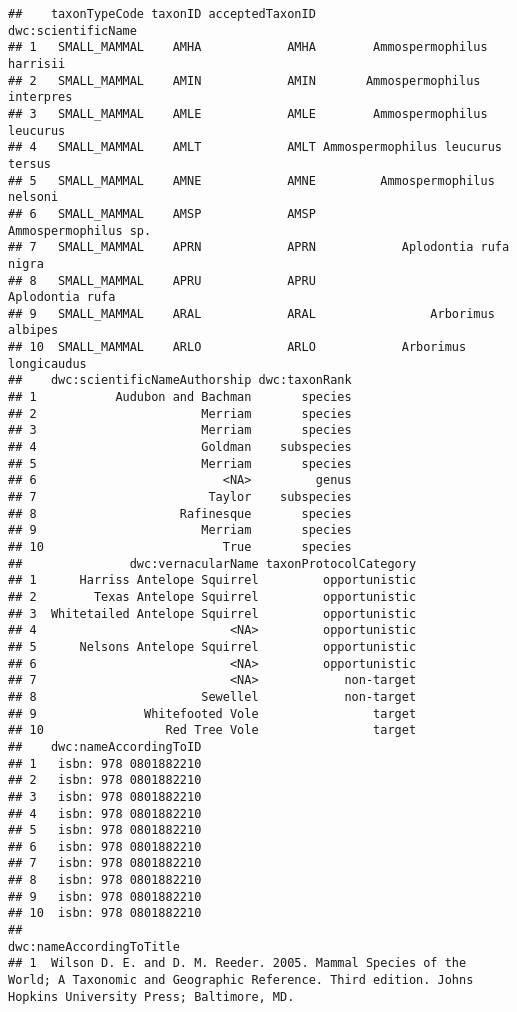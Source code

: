 \documentclass[]{book}
\begin{document}
\begin{verbatim}
##    taxonTypeCode taxonID acceptedTaxonID               dwc:scientificName
## 1   SMALL_MAMMAL    AMHA            AMHA        Ammospermophilus harrisii
## 2   SMALL_MAMMAL    AMIN            AMIN       Ammospermophilus interpres
## 3   SMALL_MAMMAL    AMLE            AMLE        Ammospermophilus leucurus
## 4   SMALL_MAMMAL    AMLT            AMLT Ammospermophilus leucurus tersus
## 5   SMALL_MAMMAL    AMNE            AMNE         Ammospermophilus nelsoni
## 6   SMALL_MAMMAL    AMSP            AMSP             Ammospermophilus sp.
## 7   SMALL_MAMMAL    APRN            APRN            Aplodontia rufa nigra
## 8   SMALL_MAMMAL    APRU            APRU                  Aplodontia rufa
## 9   SMALL_MAMMAL    ARAL            ARAL                Arborimus albipes
## 10  SMALL_MAMMAL    ARLO            ARLO            Arborimus longicaudus
##    dwc:scientificNameAuthorship dwc:taxonRank
## 1           Audubon and Bachman       species
## 2                       Merriam       species
## 3                       Merriam       species
## 4                       Goldman    subspecies
## 5                       Merriam       species
## 6                          <NA>         genus
## 7                        Taylor    subspecies
## 8                    Rafinesque       species
## 9                       Merriam       species
## 10                         True       species
##               dwc:vernacularName taxonProtocolCategory
## 1      Harriss Antelope Squirrel         opportunistic
## 2        Texas Antelope Squirrel         opportunistic
## 3  Whitetailed Antelope Squirrel         opportunistic
## 4                           <NA>         opportunistic
## 5      Nelsons Antelope Squirrel         opportunistic
## 6                           <NA>         opportunistic
## 7                           <NA>            non-target
## 8                       Sewellel            non-target
## 9               Whitefooted Vole                target
## 10                 Red Tree Vole                target
##    dwc:nameAccordingToID
## 1   isbn: 978 0801882210
## 2   isbn: 978 0801882210
## 3   isbn: 978 0801882210
## 4   isbn: 978 0801882210
## 5   isbn: 978 0801882210
## 6   isbn: 978 0801882210
## 7   isbn: 978 0801882210
## 8   isbn: 978 0801882210
## 9   isbn: 978 0801882210
## 10  isbn: 978 0801882210
##                                                                                                                                                 dwc:nameAccordingToTitle
## 1  Wilson D. E. and D. M. Reeder. 2005. Mammal Species of the World; A Taxonomic and Geographic Reference. Third edition. Johns Hopkins University Press; Baltimore, MD.

\end{verbatim}
\end{document}
